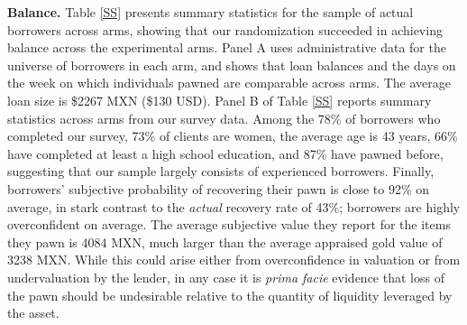 \documentclass[11pt, a4paper]{article}
\begin{document}
   

\vspace{.2in}
\noindent \textbf{Balance.} Table \ref{SS} presents summary statistics for the sample of actual borrowers across arms, showing that our randomization succeeded in achieving balance across the experimental arms. Panel A uses administrative data for the universe of borrowers in each arm, and shows that loan balances and the days on the week on which individuals pawned are comparable across arms. The average loan size is \$2267 MXN (\$130 USD). Panel B of Table \ref{SS} reports summary statistics across arms from our survey data. Among the 78\% of borrowers who completed our survey, 73\% of clients are women, the average age is 43 years, 66\% have completed at least a high school education, and 87\% have pawned before, suggesting that our sample largely consists of experienced borrowers. Finally, borrowers' subjective probability of recovering their pawn is close to 92\% on average, in stark contrast to the \emph{actual} recovery rate of 43\%; borrowers are highly overconfident on average. The average subjective value they report for the items they pawn is 4084 MXN, much larger than the average appraised gold value of 3238 MXN. While this could arise either from overconfidence in valuation or from undervaluation by the lender, in any case it is \textit{prima facie} evidence that loss of the pawn should be undesirable relative to the quantity of liquidity leveraged by the asset. 
\end{document}
